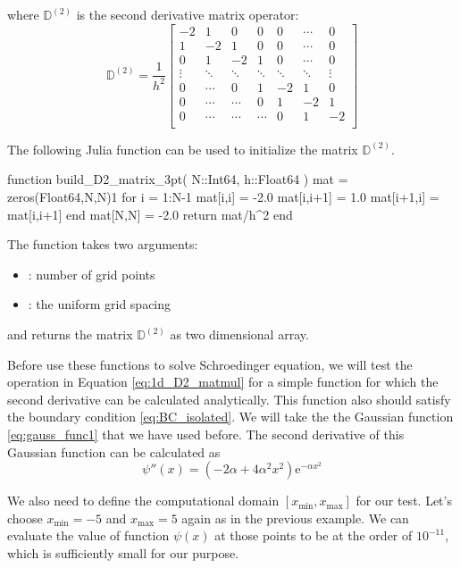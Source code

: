 where $\mathbb{D}^{(2)}$ is the second derivative matrix operator:
%
\begin{equation}
\mathbb{D}^{(2)} = \frac{1}{h^2}
\begin{bmatrix}
-2  &  1  &  0  &  0  & 0 & \cdots & 0 \\
 1  & -2  &  1  &  0  & 0 & \cdots & 0 \\
 0  &  1  & -2  &  1  & 0 & \cdots & 0 \\
 \vdots  &  \ddots  &  \ddots  & \ddots  & \ddots  & \ddots & \vdots \\
 0 & \cdots & 0 & 1 & -2 & 1 & 0 \\
 0  &  \cdots  & \cdots & 0  & 1  & -2  & 1 \\
 0  &  \cdots  & \cdots & \cdots & 0  &  1  & -2 \\
\end{bmatrix}
\label{eq:1d_D2_matmul}
\end{equation}

The following Julia function can be used to initialize the matrix $\mathbb{D}^{(2)}$.
\begin{juliacode}
function build_D2_matrix_3pt( N::Int64, h::Float64 )
    mat = zeros(Float64,N,N)1
    for i = 1:N-1
        mat[i,i] = -2.0
        mat[i,i+1] = 1.0
        mat[i+1,i] = mat[i,i+1]
    end
    mat[N,N] = -2.0
    return mat/h^2
end
\end{juliacode}
The function  takes two arguments:
\begin{itemize}
\item {}: number of grid points
\item {}: the uniform grid spacing
\end{itemize}
and returns the matrix $\mathbb{D}^{(2)}$ as two dimensional array.

Before use these functions to solve Schroedinger equation, we will test the operation
in Equation \eqref{eq:1d_D2_matmul} for a simple function for which the second derivative
can be calculated analytically. This function also should satisfy the boundary condition
\ref{eq:BC_isolated}. We will take the the Gaussian function
\eqref{eq:gauss_func1} that we have used before.
The second derivative of this Gaussian function can be calculated as
%
\begin{equation}
\psi''(x) = \left( -2 \alpha + 4\alpha^2 x^2 \right) \mathrm{e}^{-\alpha x^2}
\end{equation}

We also need to define the computational domain
$[x_{\text{min}},x_{\text{max}}]$ for our test.
Let's choose $x_{\text{min}} = -5$ and $x_{\text{max}} = 5$ again as in the previous example.
We can evaluate the value of function $\psi({x})$ at those points to be at the
order of $10^{-11}$, which is sufficiently small for our purpose.

